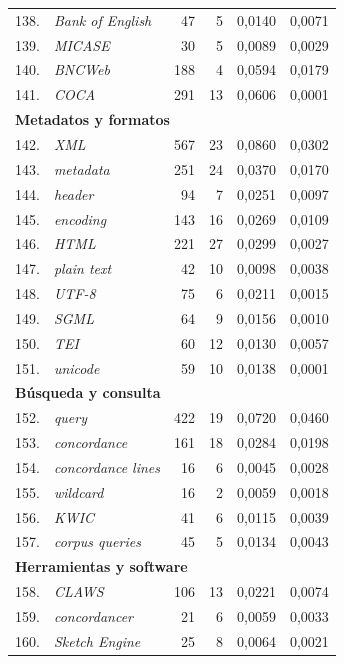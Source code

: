 \begin{longtable}{@{} r p{5cm} r r r r @{}}
138. & \textit{Bank of English} & 47 & 5 & 0{,}0140 & 0{,}0071 \\
139. & \textit{MICASE} & 30 & 5 & 0{,}0089 & 0{,}0029 \\
140. & \textit{BNCWeb} & 188 & 4 & 0{,}0594 & 0{,}0179 \\
141. & \textit{COCA} & 291 & 13 & 0{,}0606 & 0{,}0001 \\
\midrule
\multicolumn{6}{l}{\textbf{Metadatos y formatos}} \\
\midrule
142. & \textit{XML} & 567 & 23 & 0{,}0860 & 0{,}0302 \\
143. & \textit{metadata} & 251 & 24 & 0{,}0370 & 0{,}0170 \\
144. & \textit{header} & 94 & 7 & 0{,}0251 & 0{,}0097 \\
145. & \textit{encoding} & 143 & 16 & 0{,}0269 & 0{,}0109 \\
146. & \textit{HTML} & 221 & 27 & 0{,}0299 & 0{,}0027 \\
147. & \textit{plain text} & 42 & 10 & 0{,}0098 & 0{,}0038 \\
148. & \textit{UTF-8} & 75 & 6 & 0{,}0211 & 0{,}0015 \\
149. & \textit{SGML} & 64 & 9 & 0{,}0156 & 0{,}0010 \\
150. & \textit{TEI} & 60 & 12 & 0{,}0130 & 0{,}0057 \\
151. & \textit{unicode} & 59 & 10 & 0{,}0138 & 0{,}0001 \\
\midrule
\multicolumn{6}{l}{\textbf{Búsqueda y consulta}} \\
\midrule
152. & \textit{query} & 422 & 19 & 0{,}0720 & 0{,}0460 \\
153. & \textit{concordance} & 161 & 18 & 0{,}0284 & 0{,}0198 \\
154. & \textit{concordance lines} & 16 & 6 & 0{,}0045 & 0{,}0028 \\
155. & \textit{wildcard} & 16 & 2 & 0{,}0059 & 0{,}0018 \\
156. & \textit{KWIC} & 41 & 6 & 0{,}0115 & 0{,}0039 \\
157. & \textit{corpus queries} & 45 & 5 & 0{,}0134 & 0{,}0043 \\
\midrule
\multicolumn{6}{l}{\textbf{Herramientas y software}} \\
\midrule
158. & \textit{CLAWS} & 106 & 13 & 0{,}0221 & 0{,}0074 \\
159. & \textit{concordancer} & 21 & 6 & 0{,}0059 & 0{,}0033 \\
160. & \textit{Sketch Engine} & 25 & 8 & 0{,}0064 & 0{,}0021 \\

\end{longtable}
